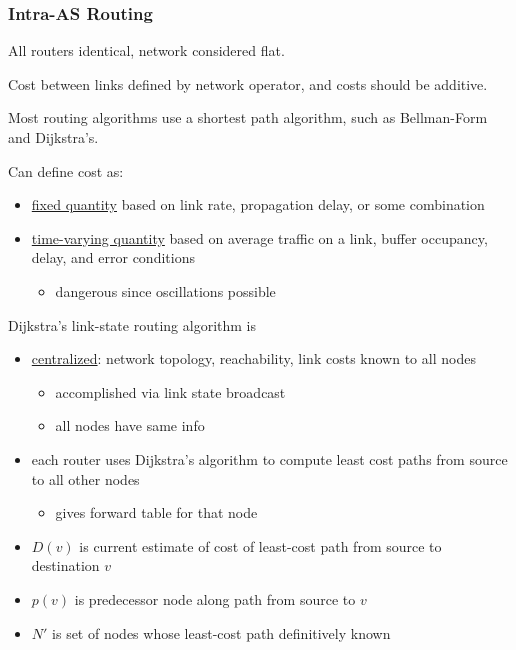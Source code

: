 \documentclass[11pt]{article}
\begin{document}
\subsubsection{Intra-AS Routing}
\label{sec:orgf1d227b}
All routers identical, network considered flat.

Cost between links defined by network operator, and costs should be additive.

Most routing algorithms use a shortest path algorithm, such as Bellman-Form and Dijkstra's.

Can define cost as:
\begin{itemize}
\item \uline{fixed quantity} based on link rate, propagation delay, or some combination
\item \uline{time-varying quantity} based on average traffic on a link, buffer occupancy, delay, and error
conditions
\begin{itemize}
\item dangerous since oscillations possible
\end{itemize}
\end{itemize}

Dijkstra's link-state routing algorithm is
\begin{itemize}
\item \uline{centralized}: network topology, reachability, link costs known to all nodes
\begin{itemize}
\item accomplished via link state broadcast
\item all nodes have same info
\end{itemize}
\item each router uses Dijkstra's algorithm to compute least cost paths from source to all other
nodes
\begin{itemize}
\item gives forward table for that node
\end{itemize}
\item \(D(v)\) is current estimate of cost of least-cost path from source to destination \(v\)
\item \(p(v)\) is predecessor node along path from source to \(v\)
\item \(N'\) is set of nodes whose least-cost path definitively known
\end{itemize}
\end{document}
